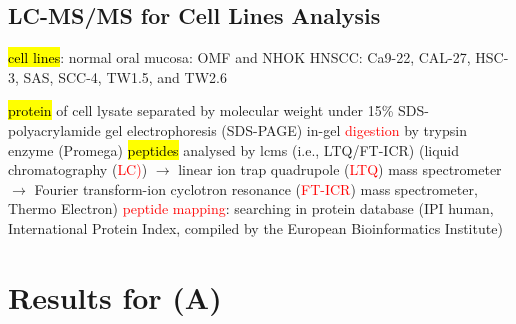 \documentclass[
paper=landscape,
paper=160mm:90mm, %
fontsize=11pt, %
pagesize, %
parskip=half-, %
]{scrartcl} %
\theoremstyle{mythmstyle} %
\begin{document}
{\clearpage


\subsection{LC-MS/MS for Cell Lines Analysis}
\thispagestyle{headings}



\begin{outline} %
\1 \hl{cell lines}:
    \2 normal oral mucosa: OMF and NHOK 
    \2 HNSCC: Ca9-22, CAL-27, HSC-3, SAS, SCC-4, TW1.5, and TW2.6

\1 \hl{protein} of cell lysate
    \2 separated by molecular weight under 15\% SDS-polyacrylamide gel electrophoresis (SDS-PAGE)
    \2 in-gel \textcolor{red}{digestion} by trypsin enzyme (Promega)
\1 \hl{peptides} analysed by 
    \2 \acrshort{lcms} (i.e., LTQ/FT-ICR) {\tiny (liquid chromatography (\textcolor{red}{LC)}) $\longrightarrow$ linear ion trap quadrupole (\textcolor{red}{LTQ}) mass spectrometer $\longrightarrow$ Fourier transform-ion cyclotron resonance (\textcolor{red}{FT-ICR}) mass spectrometer, Thermo Electron)} %
    \2 \textcolor{red}{peptide mapping}: searching in protein database \tiny (IPI human, International Protein Index, compiled by the European Bioinformatics Institute)

\end{outline}


\clearpage



\section{Results for (A)}

\clearpage



\thispagestyle{headings}


\begin{figure}[ht]



\end{figure}}
\end{document}
